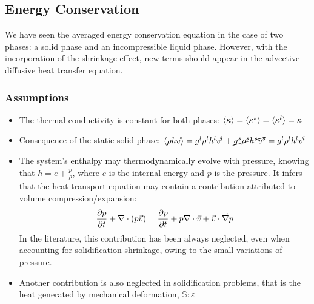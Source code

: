 \subsection{Energy Conservation}
We have seen the averaged energy conservation equation in the case of two phases: a solid phase and an incompressible liquid phase. However, with the incorporation of the shrinkage effect, new terms should appear
in the advective-diffusive heat transfer equation. 
\subsubsection{Assumptions}
\begin{itemize}
\item The thermal conductivity is constant for both phases: $\langle \kappa \rangle = \langle \kappa^s \rangle = \langle \kappa^l \rangle= \kappa $ 
\item Consequence of the static solid phase: $\langle \rho h \vec{v} \rangle = {g^l} \rho^l h^l \vec{v}^l +  \cancel{{g^s} \rho^s h^s \vec{v}^s} = {g^l} \rho^l h^l \vec{v}^l$ 
\item The system's enthalpy may thermodynamically evolve with pressure, knowing that $h=e+\frac{p}{\rho}$, where $e$ is the internal energy and $p$ is the pressure. It infers that the heat transport
equation may contain a contribution attributed to volume compression/expansion:
\begin{align}
			 \frac{\partial p}{\partial t}+\nabla \cdot \left( p \vec{v} \right)
			 = \frac{\partial p}{\partial t}+ p \nabla \cdot \vec{v} + \vec{v} \cdot \vec{\nabla} p 
\end{align}
In the literature, this contribution has been always neglected, even when accounting for solidification
shrinkage, owing to the small variations of pressure.
\item Another contribution is also neglected in solidification problems, that is the heat generated by
mechanical deformation, $\mathbb{S}:\dot{\varepsilon}$ 
\end{itemize}
